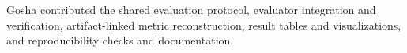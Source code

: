 Gosha contributed the shared evaluation protocol, evaluator integration and
verification, artifact-linked metric reconstruction, result tables and
visualizations, and reproducibility checks and documentation.

